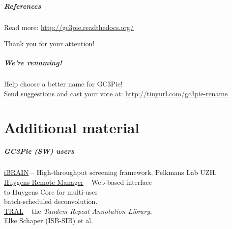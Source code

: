 \documentclass[english,serif,mathserif,xcolor=pdftex,dvipsnames,table]{beamer}
\begin{document}
\begin{frame}
  \frametitle{References}
  \begin{center}
    Read more: \url{http://gc3pie.readthedocs.org/}

    \+\+\+ {\Large Thank you for your attention!}
  \end{center}
\end{frame}

\begin{frame}
  \frametitle{We're renaming!}

  \Large\centering
  Help choose a better name for GC3Pie!
  \\ \+
  Send suggestions and cast your vote at:
  \url{http://tinyurl.com/gc3pie-rename}
\end{frame}


\part{Additional material}

\begin{frame}
  \frametitle{GC3Pie (SW) users}
  \begin{center}
    \href{http://github.com/pelkmanslab/iBRAIN_UZH}{iBRAIN} -- High-throughput screening framework, Pelkmans Lab UZH.
    \\ \+
    \href{http://huygens-remote-manager.readthedocs.org/en/latest/}{Huygens Remote Manager} -- Web-based interface \\ to Huygens Core for multi-user \\ batch-scheduled deconvolution.
    \\ \+
    \href{http://www.ncbi.nlm.nih.gov/pubmed/25987568}{TRAL} -- the \emph{Tandem Repeat Annotation Library}, \\ Elke Schaper (ISB-SIB) et al.
  \end{center}
\end{frame}
\end{document}
